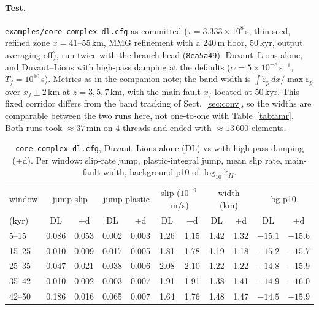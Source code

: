 \documentclass[11pt]{article}
\newcommand{\code}[1]{\texttt{#1}}
\begin{document}
\paragraph{Test.} \code{examples/core-complex-dl.cfg} as committed ($\tau=3.333\times10^8$\,s, thin
seed, refined zone $x=41$--55\,km, MMG refinement with a 240\,m floor, 50\,kyr, output averaging
off), run twice with the branch head (\code{8ea5a49}): Duvaut--Lions alone, and Duvaut--Lions with
high-pass damping at the defaults ($\alpha=5\times10^{-8}$\,s$^{-1}$, $T_f=10^{10}$\,s). Metrics as
in the companion note; the band width is $\int\dot\varepsilon_p\,dx/\max\dot\varepsilon_p$ over
$x_f\pm2$\,km at $z=3,5,7$\,km, with the main fault $x_f$ located at 50\,kyr. This fixed corridor
differs from the band tracking of Sect.~\ref{sec:conv}, so the widths are comparable between the
two runs here, not one-to-one with Table~\ref{tab:amr}. Both runs took $\approx37$\,min on 4
threads and ended with $\approx13\,600$ elements.

\begin{table}[h]
  \centering\small
  \caption{\code{core-complex-dl.cfg}, Duvaut--Lions alone (DL) vs with high-pass damping (+d).
  Per window: slip-rate jump, plastic-integral jump, mean slip rate, main-fault width, background
  p10 of $\log_{10}\dot\varepsilon_{II}$.}
  \label{tab:dlhp}
  \setlength{\tabcolsep}{4pt}
  \begin{tabular}{lcccccccccc}
  \toprule
  window & \multicolumn{2}{c}{jump slip} & \multicolumn{2}{c}{jump plastic} & \multicolumn{2}{c}{slip ($10^{-9}$\,m/s)} & \multicolumn{2}{c}{width (km)} & \multicolumn{2}{c}{bg p10}\\
  (kyr) & DL & +d & DL & +d & DL & +d & DL & +d & DL & +d\\
  \midrule
  5--15  & 0.086 & 0.053 & 0.002 & 0.003 & 1.26 & 1.15 & 1.42 & 1.32 & $-15.1$ & $-15.6$\\
  15--25 & 0.010 & 0.009 & 0.017 & 0.005 & 1.81 & 1.78 & 1.19 & 1.18 & $-15.2$ & $-15.7$\\
  25--35 & 0.047 & 0.021 & 0.038 & 0.006 & 2.08 & 2.10 & 1.22 & 1.22 & $-14.8$ & $-15.9$\\
  35--42 & 0.010 & 0.002 & 0.003 & 0.007 & 1.91 & 1.91 & 1.38 & 1.41 & $-14.9$ & $-16.0$\\
  42--50 & 0.186 & 0.016 & 0.065 & 0.007 & 1.64 & 1.76 & 1.48 & 1.47 & $-14.5$ & $-15.9$\\
  \bottomrule
  \end{tabular}
\end{table}
\end{document}
